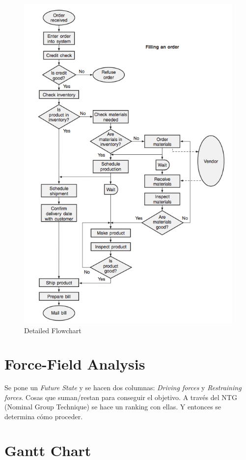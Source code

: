 \documentclass[oneside]{book}
\begin{document}
\begin{figure}[ht!]
	\centering
	\includegraphics[width=120mm]{imagenes/DetailedFlowchart.png}
	\caption{Detailed Flowchart}
	\label{fig:DetailedFlowchart}
\end{figure}

\section{Force-Field Analysis}

Se pone un \textit{Future State} y se hacen dos columnas: \textit{Driving forces} y \textit{Restraining forces}. Cosas que suman/restan para conseguir el objetivo. A través del NTG (Nominal Group Technique) se hace un ranking con ellas. Y entonces se determina cómo proceder.

\section{Gantt Chart}
\end{document}
